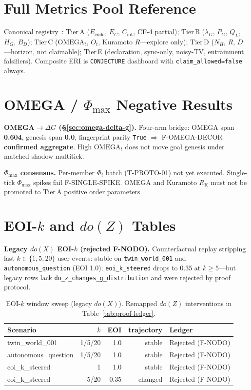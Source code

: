 \documentclass[11pt,a4paper]{article}
\theoremstyle{definition}
\begin{document}
\appendix

\section{Full Metrics Pool Reference}\label{app:metrics-pool}

Canonical registry~\cite{kuznetsov2026metrics}: Tier\,A ($E_{\mathrm{endo}}$, $E_C$, $C_{\mathrm{int}}$, CF-4 partial); Tier\,B ($\lambda_G$, $P_G$, $Q_L$, $H_G$, $B_D$); Tier\,C ($\mathrm{OMEGA}_t$, $O_t$, Kuramoto $R$---explore only); Tier\,D ($N_H$, $R$, $D$---horizon, not claimable); Tier\,E (declaration, sync-only, noisy-TV, entrainment falsifiers). Composite ERI is \texttt{CONJECTURE} dashboard with \texttt{claim\_allowed=false} always.

\section{OMEGA / $\Phi_{\max}$ Negative Results}\label{app:omega-negative}

\textbf{OMEGA$\to\Delta G$ (§\ref{sec:omega-delta-g}).} Four-arm bridge: OMEGA span \textbf{0.604}, genesis span \textbf{0.0}, fingerprint parity \texttt{True} $\Rightarrow$ F-OMEGA-DECOR \textbf{confirmed aggregate}. High $\mathrm{OMEGA}_t$ does not move goal genesis under matched shadow multitick.

\textbf{$\Phi_{\max}$ consensus.} Per-member $\Phi_i$ batch (T-PROTO-01) not yet executed. Single-tick $\Phi_{\max}$ spikes fail F-SINGLE-SPIKE. OMEGA and Kuramoto $R_{\mathrm{K}}$ must not be promoted to Tier\,A positive order parameters.

\section{EOI-$k$ and $do(Z)$ Tables}\label{app:eoi-k}

\textbf{Legacy $do(X)$ EOI-$k$ (rejected F-NODO).} Counterfactual replay stripping last $k\in\{1,5,20\}$ user events: stable on \texttt{twin\_world\_001} and \texttt{autonomous\_question} (EOI 1.0); \texttt{eoi\_k\_steered} drops to 0.35 at $k\geq 5$---but legacy rows lack \texttt{do\_z\_changes\_g\_distribution} and were rejected by proof protocol.

\begin{table}[H]
\centering\small
\begin{tabular}{lrrrl}
\toprule Scenario & $k$ & EOI & trajectory & Ledger \\ \midrule
twin\_world\_001 & 1/5/20 & 1.0 & stable & Rejected (F-NODO) \\
autonomous\_question & 1/5/20 & 1.0 & stable & Rejected (F-NODO) \\
eoi\_k\_steered & 1 & 1.0 & stable & Rejected (F-NODO) \\
eoi\_k\_steered & 5/20 & 0.35 & changed & Rejected (F-NODO) \\ \bottomrule
\end{tabular}
\caption{EOI-$k$ window sweep (legacy $do(X)$). Remapped $do(Z)$ interventions in Table~\ref{tab:proof-ledger}.}
\label{tab:eoi-k}
\end{table}
\end{document}
